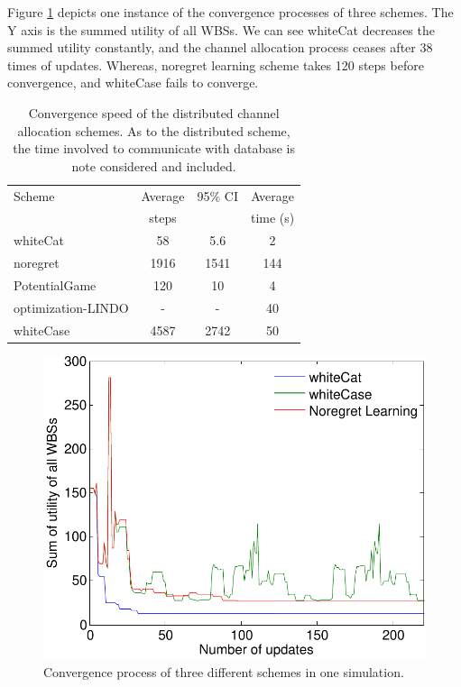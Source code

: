 \documentclass[times]{ettauth}
\theoremstyle{mytheoremstyle}
\theoremstyle{mytheoremstyle}
\theoremstyle{mytheoremstyle}
\begin{document}
Figure \ref{convergeComp} depicts one instance of the convergence processes of three schemes.
The Y axis is the summed utility of all WBSs.
We can see whiteCat decreases the summed utility constantly, and the channel allocation process ceases after 38 times of updates.
Whereas, noregret learning scheme takes 120 steps before convergence, and whiteCase fails to converge.
\begin{table}[!h]
\centering
\begin{tabular}{|l|c|c|c|}
  \hline
  Scheme			 						& Average  	 		& 95\% CI			&Average \\
  												& steps					&							&time (s) \\
    \hhline{|=|=|=|=|}
  whiteCat									& 58						& 5.6						&2\\\hline
  noregret									& 1916						& 1541						&144\\\hline
  PotentialGame~\cite{pimrc_2012}			& 120						& 10						&4\\\hline
  optimization-LINDO						& -                         & -                         &40\\\hline
  whiteCase 								& 4587 						& 2742						&50\\  
  \hline
\end{tabular}
\caption{Convergence speed of the distributed channel allocation schemes. As to the distributed scheme, the time involved to communicate with database is note considered and included.}
\label{convergencespeed}
\end{table}


\begin{figure}[h!]
  \centering
  \includegraphics[width=0.8\linewidth]{convergence.pdf}
  \caption{Convergence process of three different schemes in one simulation.}
\label{convergeComp}
\end{figure}
\end{document}
